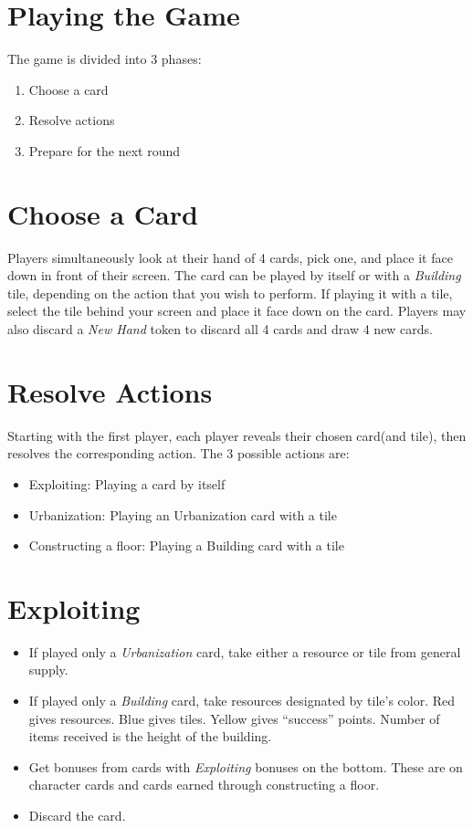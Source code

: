 \documentclass[12pt]{article}
\newenvironment{enumerateCustom}
{\begin{enumerate}
  \setlength{\itemsep}{1pt}
  \setlength{\parskip}{0pt}
  \setlength{\parsep}{0pt}}
{\end{enumerate}}
\newenvironment{itemizeCustom}
{\begin{itemize}
  \setlength{\itemsep}{1pt}
  \setlength{\parskip}{0pt}
  \setlength{\parsep}{0pt}}
{\end{itemize}}
\begin{document}
\begin{multicols*}{2}
\section*{Playing the Game}
The game is divided into 3 phases:
\begin{enumerateCustom}
	\item Choose a card
	\item Resolve actions
	\item Prepare for the next round
\end{enumerateCustom}

\section*{Choose a Card}
Players simultaneously look at their hand of 4 cards, pick one, and place it face down in front of their screen. The card can be played by itself or with a \emph{Building} tile, depending on the action that you wish to perform. If playing it with a tile, select the tile behind your screen and place it face down on the card. Players may also discard a \emph{New Hand} token to discard all 4 cards and draw 4 new cards.

\section*{Resolve Actions}
Starting with the first player, each player reveals their chosen card(and tile), then resolves the corresponding action. The 3 possible actions are:
\begin{itemizeCustom}
	\item Exploiting: Playing a card by itself
	\item Urbanization: Playing an Urbanization card with a tile
	\item Constructing a floor: Playing a Building card with a tile
\end{itemizeCustom}

\section*{Exploiting}
\begin{itemizeCustom}
	\item If played only a \emph{Urbanization} card, take either a resource or tile from general supply.
	\item If played only a \emph{Building} card, take resources designated by tile's color. Red gives resources. Blue gives tiles. Yellow gives ``success'' points. Number of items received is the height of the building.
	\item Get bonuses from cards with \emph{Exploiting} bonuses on the bottom. These are on character cards and cards earned through constructing a floor.
	\item Discard the card.
\end{itemizeCustom}


\end{multicols*}
\end{document}
